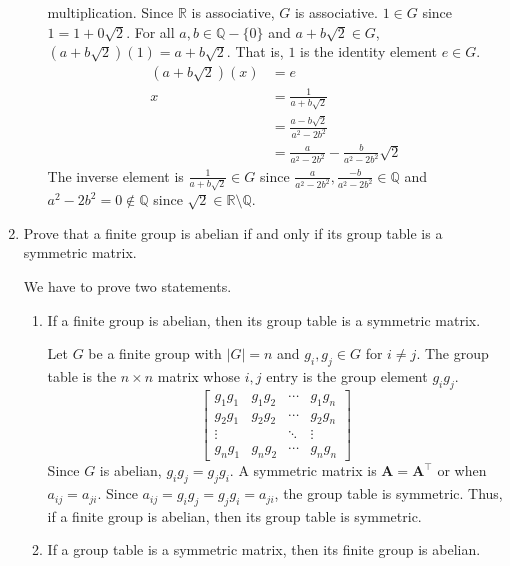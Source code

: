 \begin{enumerate}
\begin{enumerate}[label = (\alph*)]
    multiplication.
    Since \(\mathbb{R}\) is associative, \(G\) is associative.
    \(1\in G\) since \(1 = 1 + 0\sqrt{2}\).
    For all \(a,b\in\mathbb{Q} - \{0\}\) and \(a + b\sqrt{2}\in G\),
    \((a + b\sqrt{2})(1) = a + b\sqrt{2}\).
    That is, \(1\) is the identity element \(e\in G\).
    \begin{align*}
      (a + b\sqrt{2})(x) & = e\\
      x & = \frac{1}{a + b\sqrt{2}}\\
                         & = \frac{a - b\sqrt{2}}{a^2 - 2b^2}\\
                         & = \frac{a}{a^2 - 2b^2} - \frac{b}{a^2 - 2b^2}
                           \sqrt{2}
    \end{align*}
    The inverse element is \(\frac{1}{a + b\sqrt{2}}\in G\) since
    \(\frac{a}{a^2 - 2b^2}, \frac{-b}{a^2 - 2b^2}\in\mathbb{Q}\) and
    \(a^2 - 2b^2 = 0\not\in\mathbb{Q}\) since
    \(\sqrt{2}\in\mathbb{R}\setminus\mathbb{Q}\).
  \end{enumerate}
\item
  Prove that a finite group is abelian if and only if its group table is a
  symmetric matrix.
  \par\smallskip
  We have to prove two statements.
  \begin{enumerate}[label = (\alph*)]
  \item
    If a finite group is abelian, then its group table is a symmetric matrix.
    \par\smallskip
    Let \(G\) be a finite group with \(\lvert G\rvert = n\) and
    \(g_i, g_j\in G\) for \(i\neq j\).
    The group table is the \(n\times n\) matrix whose \(i,j\) entry is the
    group element \(g_ig_j\).
    \[
    \begin{bmatrix}
      g_1g_1 & g_1g_2 & \cdots & g_1g_n\\
      g_2g_1 & g_2g_2 & \cdots & g_2g_n\\
      \vdots & & \ddots & \vdots\\
      g_ng_1 & g_ng_2 & \cdots & g_ng_n
    \end{bmatrix}
    \]
    Since \(G\) is abelian, \(g_ig_j = g_jg_i\).
    A symmetric matrix is \(\mathbf{A} = \mathbf{A}^{\intercal}\) or when
    \(a_{ij} = a_{ji}\).
    Since \(a_{ij} = g_ig_j = g_jg_i = a_{ji}\), the group table is symmetric.
    Thus, if a finite group is abelian, then its group table is symmetric.
  \item
    If a group table is a symmetric matrix, then its finite group is abelian.

\end{enumerate}
\end{enumerate}
